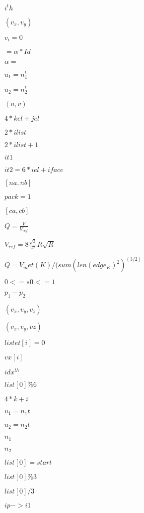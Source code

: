 \documentclass{article}
\begin{document}
$i^th$
\pagebreak

$(v_x,v_y)$
\pagebreak

$v_i = 0$
\pagebreak

$=\alpha*Id$
\pagebreak

$\alpha =$
\pagebreak

$ u_1 = n_1^t$
\pagebreak

$ u_2 = n_2^t$
\pagebreak

$(u,v)$
\pagebreak

$4*kel + jel$
\pagebreak

$2*ilist$
\pagebreak

$2*ilist+1$
\pagebreak

$ it1 $
\pagebreak

$ it2 = 6*iel + iface$
\pagebreak

$[na,nb]$
\pagebreak

$pack=1$
\pagebreak

$[ca,cb]$
\pagebreak

$Q=\frac{V}{V_{ref}}$
\pagebreak

$V_{ref}=8\frac{\sqrt{3}}{27}R \sqrt{R}$
\pagebreak

$ Q = V_met(K) / (sum(len(edge_K)^2)^(3/2) $
\pagebreak

$ 0 <= s0 <= 1 $
\pagebreak

$ p_1-p_2 $
\pagebreak

$(v_x,v_y,v_z)$
\pagebreak

$(v_x,v_y,vz)$
\pagebreak

$listet[i] = 0$
\pagebreak

$vx[i]$
\pagebreak

$ idx^{th} $
\pagebreak

$list[0]\%6$
\pagebreak

$4*k+i$
\pagebreak

$ u_1 = n_1^{}t$
\pagebreak

$ u_2 = n_2^{}t$
\pagebreak

$ n_1$
\pagebreak

$ n_2$
\pagebreak

$list[0] = start$
\pagebreak

$list[0]\%3$
\pagebreak

$list[0]/3$
\pagebreak

$ ip->i1$
\pagebreak
\end{document}
